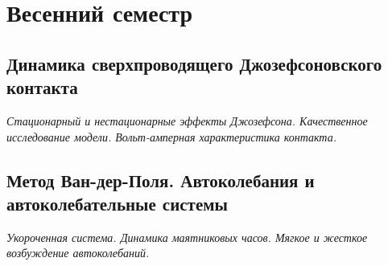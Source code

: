 \documentclass[14pt,a4paper]{extreport}
\theoremstyle{definition}
\begin{document}
\part{Весенний семестр}
\newpage
\chapter{Динамика сверхпроводящего Джозефсоновского контакта}
\epigraph{\textit{Стационарный и нестационарные эффекты Джозефсона.
Качественное исследование модели. Вольт-амперная
характеристика контакта.}}{}
\label{sec:lect11}
    

\newpage
\chapter{Метод Ван-дер-Поля. Автоколебания и автоколебательные системы}
\epigraph{\textit{Укороченная система. Динамика маятниковых часов. Мягкое и
жесткое возбуждение автоколебаний.}}{}
\label{sec:lect11}
    

% 	

% 	





% 



% 	

% 	
	
\end{document}
